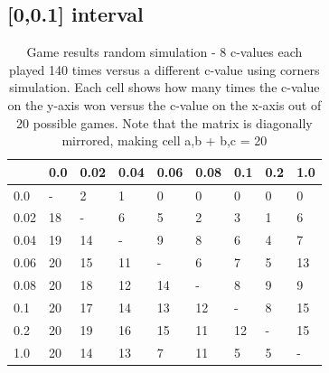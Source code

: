 \documentclass[
11pt, %
english, %
singlespacing, %
headsepline, %
]{MastersDoctoralThesis} %
\begin{document}
\begin{appendices}
\section{[0,0.1] interval}
\begin{table}[H]
	\centering
	\begin{tabular}{|l||l|l|l|l|l|l|l|l|}
		\hline
		& 0.0 & 0.02 & 0.04 & 0.06 & 0.08 & 0.1 & 0.2 & 1.0 \\ \hline\hline
		0.0  & -   & 2    & 1    & 0    & 0    & 0   & 0   & 0   \\ \hline
		0.02 & 18  & -    & 6    & 5    & 2    & 3   & 1   & 6   \\ \hline
		0.04 & 19  & 14   & -    & 9    & 8    & 6   & 4   & 7   \\ \hline
		0.06 & 20  & 15   & 11   & -    & 6    & 7   & 5   & 13  \\ \hline
		0.08 & 20  & 18   & 12   & 14   & -    & 8   & 9   & 9   \\ \hline
		0.1  & 20  & 17   & 14   & 13   & 12   & -   & 8   & 15  \\ \hline
		0.2  & 20  & 19   & 16   & 15   & 11   & 12  & -   & 15  \\ \hline
		1.0  & 20  & 14   & 13   & 7    & 11   & 5   & 5   & -   \\ \hline
	\end{tabular}
	\caption{Game results random simulation - 8 c-values each played 140 times versus a different c-value using corners simulation. Each cell shows how many times the c-value on the y-axis won versus the c-value on the x-axis out of 20 possible games. Note that the matrix is diagonally mirrored, making cell a,b + b,c = 20}
	\label{table:ranking-matrix-random-zero}
\end{table}


\end{appendices}
\end{document}
